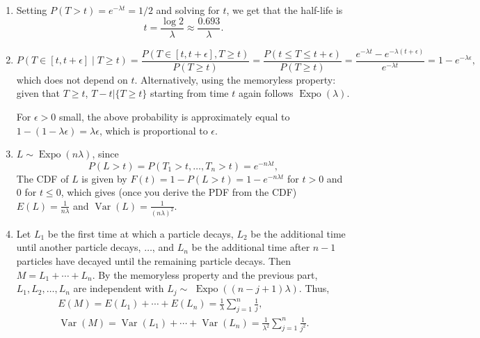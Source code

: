 

\setcounter{theorem}{36}
\begin{exercise}[BH.5.37] 
\begin{solution}
    \begin{enumerate}
        \item  Setting $P(T>t)=e^{-\lambda t}=1 / 2$ and solving for $t$, we get that the half-life is
        $$
        t=\frac{\log 2}{\lambda} \approx \frac{0.693}{\lambda} .
        $$
        \item  
        $$
        P(T \in[t, t+\epsilon] \mid T \geq t)=\frac{P(T \in[t, t+\epsilon], T \geq t)}{P(T \geq t)}=\frac{P(t \leq T \leq t+\epsilon)}{P(T \geq t)}=\frac{e^{-\lambda t}-e^{-\lambda(t+\epsilon)}}{e^{-\lambda t}}=1-e^{-\lambda \epsilon},
        $$
        which does not depend on $t$. Alternatively, using the memoryless property: given that $T \geq t$,  $T-t|\{T \geq t\}$ starting from time $t$ again follows $\operatorname{Expo}(\lambda)$.
        
        For $\epsilon>0$ small, the above probability is approximately equal to $1-(1-\lambda \epsilon)=\lambda \epsilon$, which is proportional to $\epsilon$.
        \item  $L \sim \operatorname{Expo}(n \lambda)$, since
        $$
        P(L>t)=P\left(T_1>t, \ldots, T_n>t\right)=e^{-n \lambda t},
        $$
     The CDF of $L$ is given by $F(t)=1-P(L>t)=1-e^{-n \lambda t}$ for $t>0$ and 0 for $t \leq 0$, which gives (once you derive the PDF from the CDF) $E(L)=\frac{1}{n \lambda}$ and $\operatorname{Var}(L)=\frac{1}{(n \lambda)^2}$.
        \item Let $L_1$ be the first time at which a particle decays, $L_2$ be the additional time until another particle decays, $\ldots$, and $L_n$ be the additional time after $n-1$ particles have decayed until the remaining particle decays. Then $M=L_1+\cdots+L_n$. By the memoryless property and the previous part, $L_1, L_2, \ldots, L_n$ are independent with $L_j \sim$ $\operatorname{Expo}((n-j+1) \lambda)$. Thus,
        $$
        \begin{gathered}
            E(M)=E\left(L_1\right)+\cdots+E\left(L_n\right)=\frac{1}{\lambda} \sum_{j=1}^n \frac{1}{j}, \\
            \operatorname{Var}(M)=\operatorname{Var}\left(L_1\right)+\cdots+\operatorname{Var}\left(L_n\right)=\frac{1}{\lambda^2} \sum_{j=1}^n \frac{1}{j^2} .
        \end{gathered}
        $$
    \end{enumerate}
\end{solution}
\end{exercise}


